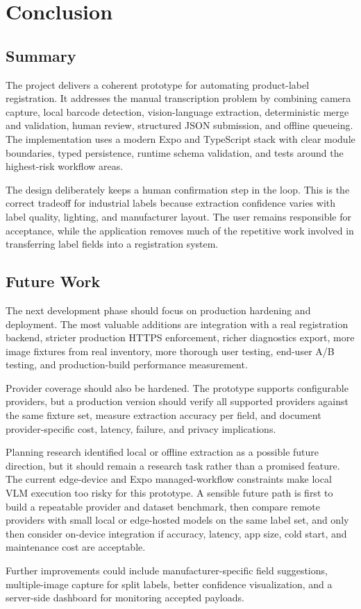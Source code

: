 \chapter{Conclusion}
\label{chap:conclusion}

\section{Summary}

The project delivers a coherent prototype for automating product-label registration. It addresses the manual transcription problem by combining camera capture, local barcode detection, vision-language extraction, deterministic merge and validation, human review, structured JSON submission, and offline queueing. The implementation uses a modern Expo and TypeScript stack with clear module boundaries, typed persistence, runtime schema validation, and tests around the highest-risk workflow areas.

The design deliberately keeps a human confirmation step in the loop. This is the correct tradeoff for industrial labels because extraction confidence varies with label quality, lighting, and manufacturer layout. The user remains responsible for acceptance, while the application removes much of the repetitive work involved in transferring label fields into a registration system.

\section{Future Work}

The next development phase should focus on production hardening and deployment. The most valuable additions are integration with a real registration backend, stricter production HTTPS enforcement, richer diagnostics export, more image fixtures from real inventory, more thorough user testing, end-user A/B testing, and production-build performance measurement.

Provider coverage should also be hardened. The prototype supports configurable providers, but a production version should verify all supported providers against the same fixture set, measure extraction accuracy per field, and document provider-specific cost, latency, failure, and privacy implications.

Planning research identified local or offline extraction as a possible future direction, but it should remain a research task rather than a promised feature. The current edge-device and Expo managed-workflow constraints make local VLM execution too risky for this prototype. A sensible future path is first to build a repeatable provider and dataset benchmark, then compare remote providers with small local or edge-hosted models on the same label set, and only then consider on-device integration if accuracy, latency, app size, cold start, and maintenance cost are acceptable.

Further improvements could include manufacturer-specific field suggestions, multiple-image capture for split labels, better confidence visualization, and a server-side dashboard for monitoring accepted payloads.
